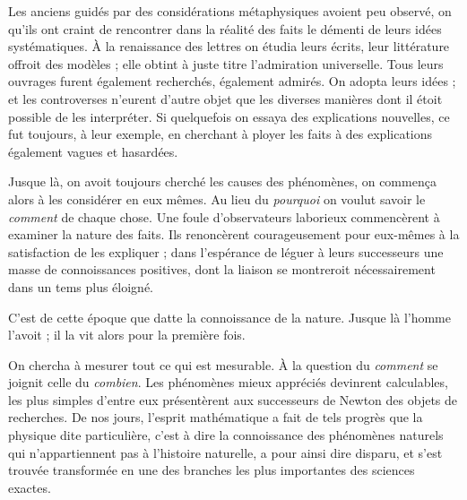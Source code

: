 \documentclass[11pt,a4paper]{article}
\begin{document}
Les anciens guidés par des considérations métaphysiques avoient peu
observé,  on  qu'ils ont
craint de rencontrer dans la réalité des faits le démenti 
de leurs idées systématiques. À la renaissance des
lettres on étudia leurs écrits, leur littérature offroit des modèles ;
elle obtint à juste titre l'admiration universelle.  Tous
leurs ouvrages furent également recherchés, également admirés. On adopta
leurs idées ; et les controverses  n'eurent d'autre objet
que les diverses manières dont il étoit possible de les interpréter. Si
quelquefois on essaya des explications nouvelles, ce fut toujours, à
leur exemple, en cherchant à ployer les faits à des explications
également vagues et hasardées.

Jusque là, on avoit toujours cherché les causes des phénomènes, on
commença alors à les considérer en eux mêmes. Au lieu du \emph{pourquoi}
on voulut savoir le \emph{comment} de chaque chose. Une foule
d'observateurs laborieux commencèrent à examiner la nature des faits.
Ils renoncèrent courageusement pour eux-mêmes à la satisfaction de les
expliquer ; dans l'espérance de léguer à leurs successeurs une masse de
 connoissances positives, dont la liaison se
 montreroit nécessairement dans un tems plus
éloigné.

C'est de cette époque que datte la connoissance de la nature. Jusque là
l'homme l'avoit  ; il la vit alors pour la première
fois.

On chercha à mesurer tout ce qui est mesurable. À la question du
\emph{comment} se joignit celle du \emph{combien}. Les phénomènes mieux
appréciés devinrent calculables, les plus simples d'entre eux
 présentèrent aux successeurs de
Newton des objets de recherches. De nos jours, l'esprit mathématique a
fait de tels progrès que la physique dite particulière, c'est à dire la
connoissance des phénomènes naturels qui n'appartiennent pas à l'histoire
naturelle, a pour ainsi dire disparu, et s'est trouvée transformée en une
des branches les plus importantes des sciences exactes.
\end{document}
